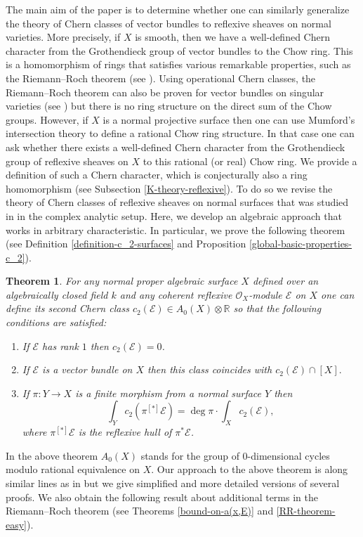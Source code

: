 \documentclass[twoside, 11pt]{article}
\theoremstyle{plain}
\newtheorem{Theorem}[Thm]{\sc Theorem}
\theoremstyle{definition}
\theoremstyle{remark}
\newcommand{\RR}{{\mathbb R}}
\newcommand{\cE}{{\mathcal E}}
\newcommand{\cO}{{\mathcal O}}
\begin{document}
The main aim of the paper is to determine whether one can similarly generalize the theory of Chern classes of vector bundles to reflexive sheaves on normal varieties. More precisely, if $X$ is smooth, then we have a well-defined Chern character from the Grothendieck group of vector bundles to the Chow ring. This is a homomorphism of rings that satisfies various remarkable properties, such as the Riemann--Roch theorem (see \cite[Chapter 15]{Fu}).  Using operational Chern classes, the Riemann--Roch theorem can also  be  proven for vector bundles on singular varieties (see \cite{BFM}) but there is no ring structure on the direct sum of the Chow groups.
However, if $X$ is a normal projective surface then one can use Mumford's intersection theory to define a rational Chow ring structure. In that case one can ask whether there exists a well-defined Chern character from the Grothendieck group of reflexive sheaves on $X$ to this rational (or real) Chow ring. 
We provide a definition of such a Chern character, which is conjecturally also a ring homomorphism (see Subsection \ref{K-theory-reflexive}).
To do so we revise the theory of Chern classes of reflexive sheaves on normal surfaces that was studied in \cite{La0} in the complex analytic setup. Here, we develop an algebraic approach that works in arbitrary characteristic.  In particular, we prove the following theorem (see Definition \ref{definition-c_2-surfaces} and Proposition \ref{global-basic-properties-c_2}).

\begin{Theorem}
For any normal proper algebraic surface $X$ defined over an algebraically closed field $k$ and  any 
coherent reflexive $\cO_X$-module $\cE$ on $X$ one can define its second Chern class $c_2 (\cE)\in A_0(X)\otimes \RR$
so that the following conditions are satisfied:
\begin{enumerate}
\item If $\cE$ has rank $1$ then  $c_2(\cE)=0$.
\item If $\cE$ is a vector bundle on $X$ then this class coincides with $c _2 (\cE)\cap [X].$
\item If  $ \pi: Y\to X$ is a finite morphism from a normal  surface $Y$ then
$$\int_Yc_2 ( \pi ^{[*]}\cE) = \deg \pi \cdot \int_Xc_2(\cE),$$
where $ \pi ^{[*]}\cE$ is the reflexive hull of $ \pi ^*\cE$.
\end{enumerate}
\end{Theorem}

In the above theorem $A_0(X)$ stands for the group of $0$-dimensional cycles modulo rational equivalence on $X$. Our approach to the above theorem is along similar lines as in \cite{La0} but we give simplified and more detailed versions of several proofs. We also obtain the following result about additional terms in the Riemann--Roch theorem (see Theorems \ref{bound-on-a(x,E)} and \ref{RR-theorem-easy}).
\end{document}
